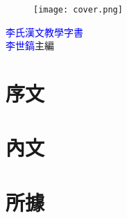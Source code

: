 \documentclass[a5paper,11pt]{book}
\begin{document}
\frontmatter
\doublespacing
\begin{wrapfigure}{r}{50mm}
\texttt{[image: cover.png]}
\end{wrapfigure}
\hfill
\vfill
{\Huge\textcolor{blue}{李氏漢文教學字書}}\\
{\textcolor{blue}{李世鎬}\hspace{14pt}主編}
\vspace{64pt}
\newpage
\addtolength{\topmargin}{20mm}
\mainmatter

\chapter*{序文}
\doublespacing


\chapter*{內文}
\begin{multicols}{3}
\onehalfspacing

\end{multicols}

\chapter*{所據}
\doublespacing

\end{document}
